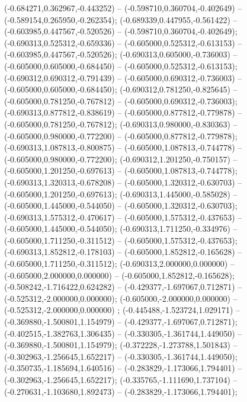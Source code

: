  (-0.684271,0.362967,-0.443252) -- (-0.598710,0.360704,-0.402649) -- (-0.589154,0.265950,-0.262354);
 (-0.689339,0.447955,-0.561422) -- (-0.603985,0.447567,-0.520526) -- (-0.598710,0.360704,-0.402649);
 (-0.690313,0.525312,-0.659336) -- (-0.605000,0.525312,-0.613153) -- (-0.603985,0.447567,-0.520526);
 (-0.690313,0.605000,-0.736003) -- (-0.605000,0.605000,-0.684450) -- (-0.605000,0.525312,-0.613153);
 (-0.690312,0.690312,-0.791439) -- (-0.605000,0.690312,-0.736003) -- (-0.605000,0.605000,-0.684450);
 (-0.690312,0.781250,-0.825645) -- (-0.605000,0.781250,-0.767812) -- (-0.605000,0.690312,-0.736003);
 (-0.690313,0.877812,-0.838619) -- (-0.605000,0.877812,-0.779878) -- (-0.605000,0.781250,-0.767812);
 (-0.690313,0.980000,-0.830363) -- (-0.605000,0.980000,-0.772200) -- (-0.605000,0.877812,-0.779878);
 (-0.690313,1.087813,-0.800875) -- (-0.605000,1.087813,-0.744778) -- (-0.605000,0.980000,-0.772200);
 (-0.690312,1.201250,-0.750157) -- (-0.605000,1.201250,-0.697613) -- (-0.605000,1.087813,-0.744778);
 (-0.690313,1.320313,-0.678208) -- (-0.605000,1.320312,-0.630703) -- (-0.605000,1.201250,-0.697613);
 (-0.690313,1.445000,-0.585028) -- (-0.605000,1.445000,-0.544050) -- (-0.605000,1.320312,-0.630703);
 (-0.690313,1.575312,-0.470617) -- (-0.605000,1.575312,-0.437653) -- (-0.605000,1.445000,-0.544050);
 (-0.690313,1.711250,-0.334976) -- (-0.605000,1.711250,-0.311512) -- (-0.605000,1.575312,-0.437653);
 (-0.690313,1.852812,-0.178103) -- (-0.605000,1.852812,-0.165628) -- (-0.605000,1.711250,-0.311512);
 (-0.690313,2.000000,0.000000) -- (-0.605000,2.000000,0.000000) -- (-0.605000,1.852812,-0.165628);
 (-0.508242,-1.716422,0.624282) -- (-0.429377,-1.697067,0.712871) -- (-0.525312,-2.000000,0.000000);
 (-0.605000,-2.000000,0.000000) -- (-0.525312,-2.000000,0.000000) ;
 (-0.445488,-1.523724,1.029171) -- (-0.369880,-1.500801,1.154979) -- (-0.429377,-1.697067,0.712871);
 (-0.402515,-1.382763,1.306435) -- (-0.330305,-1.361744,1.449050) -- (-0.369880,-1.500801,1.154979);
 (-0.372228,-1.273788,1.501843) -- (-0.302963,-1.256645,1.652217) -- (-0.330305,-1.361744,1.449050);
 (-0.350735,-1.185694,1.640516) -- (-0.283829,-1.173066,1.794401) -- (-0.302963,-1.256645,1.652217);
 (-0.335765,-1.111690,1.737104) -- (-0.270631,-1.103680,1.892473) -- (-0.283829,-1.173066,1.794401);
